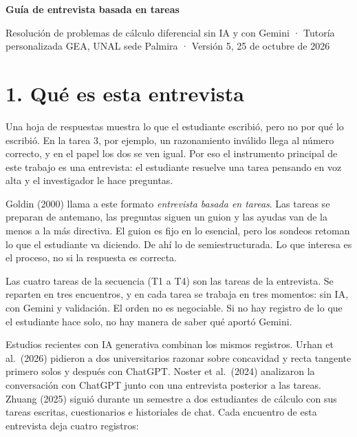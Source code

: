 \documentclass[11pt,letterpaper]{article}
\begin{document}
{\Large\bfseries Guía de entrevista basada en tareas\par}
\smallskip
{\small Resolución de problemas de cálculo diferencial sin IA y con Gemini · Tutoría personalizada GEA, UNAL sede Palmira · Versión 5, 25 de octubre de 2026\par}

\section*{1. Qué es esta entrevista}

Una hoja de respuestas muestra lo que el estudiante escribió, pero no por qué lo escribió. En la tarea 3, por ejemplo, un razonamiento inválido llega al número correcto, y en el papel los dos se ven igual. Por eso el instrumento principal de este trabajo es una entrevista: el estudiante resuelve una tarea pensando en voz alta y el investigador le hace preguntas.

Goldin (2000) llama a este formato \emph{entrevista basada en tareas}. Las tareas se preparan de antemano, las preguntas siguen un guion y las ayudas van de la menos a la más directiva. El guion es fijo en lo esencial, pero los sondeos retoman lo que el estudiante va diciendo. De ahí lo de semiestructurada. Lo que interesa es el proceso, no si la respuesta es correcta.

Las cuatro tareas de la secuencia (T1 a T4) son las tareas de la entrevista. Se reparten en tres encuentros, y en cada tarea se trabaja en tres momentos: sin IA, con Gemini y validación. El orden no es negociable. Si no hay registro de lo que el estudiante hace solo, no hay manera de saber qué aportó Gemini.

Estudios recientes con IA generativa combinan los mismos registros. Urhan et al.\ (2026) pidieron a dos universitarios razonar sobre concavidad y recta tangente primero solos y después con ChatGPT. Noster et al.\ (2024) analizaron la conversación con ChatGPT junto con una entrevista posterior a las tareas. Zhuang (2025) siguió durante un semestre a dos estudiantes de cálculo con sus tareas escritas, cuestionarios e historiales de chat. Cada encuentro de esta entrevista deja cuatro registros:
\end{document}
